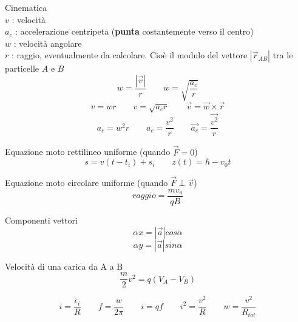 \documentclass[14pt]{extarticle}
\begin{document}
Cinematica\\
$v$ : velocità\\
$a_c$ : accelerazione centripeta (\textbf{punta} costantemente verso il centro)\\
$w$ : velocità angolare\\
$r$ : raggio, eventualmente da calcolare. Cioè il modulo del vettore $|\overrightarrow{r}_{AB}|$  tra le particelle $A$ e $B$
\begin{equation*}
    w=\frac{\left | \overrightarrow v \right |}{r}
    \quad\quad
    w=\sqrt{\frac{a_c}{r}}
\end{equation*}
\begin{equation*}
    v=wr
    \quad\quad
    v=\sqrt{a_cr}
    \quad\quad
    \overrightarrow{v}=\overrightarrow{w}\times\overrightarrow{r}
\end{equation*}
\begin{equation*}
    a_c=w^2r
    \quad\quad
    a_c=\frac{v^2}{r}
    \quad\quad
    \overrightarrow{a_c}=\frac{\overrightarrow{v^2}}{r}
\end{equation*}


Equazione moto rettilineo uniforme (quando $\overrightarrow{F}=0$)
\begin{equation*}
    s=v(t-t_i)+s_i
    \quad\quad
    z(t)=h-v_0t
\end{equation*}

Equazione moto circolare uniforme (quando $\overrightarrow{F}\perp\overrightarrow{v}$)
\begin{equation*}
    raggio = \frac{mv_o}{qB}
\end{equation*}

Componenti vettori
\begin{equation*}
    \alpha x= \left | \overrightarrow{a} \right |cos\alpha
\end{equation*}
\begin{equation*}
    \alpha y= \left | \overrightarrow{a} \right |sin\alpha
\end{equation*}

Velocità di una carica da A a B
\begin{equation*}
    \frac{m}{2}v^2=q(V_A-V_B)
\end{equation*}

\begin{equation*}
    i=\frac{\epsilon_i}{R}
    \quad\quad
    f=\frac{w}{2\pi}
    \quad\quad
    i=qf
    \quad\quad
    i^2=\frac{v^2}{R}
    \quad\quad
    w=\frac{v^2}{R_{tot}}
\end{equation*}
\end{document}
